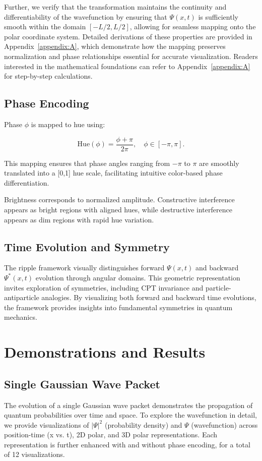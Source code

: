 \documentclass[12pt]{article}
\begin{document}
Further, we verify that the transformation maintains the continuity and differentiability of the wavefunction by ensuring that \(\Psi(x,t)\) is sufficiently smooth within the domain \([-L/2, L/2]\), allowing for seamless mapping onto the polar coordinate system. Detailed derivations of these properties are provided in Appendix~\ref{appendix:A}, which demonstrate how the mapping preserves normalization and phase relationships essential for accurate visualization. Readers interested in the mathematical foundations can refer to Appendix~\ref{appendix:A} for step-by-step calculations.

\subsection{Phase Encoding}
Phase \(\phi\) is mapped to hue using:

\[
\text{Hue}(\phi) = \frac{\phi + \pi}{2\pi}, \quad \phi \in [-\pi, \pi].
\]

This mapping ensures that phase angles ranging from \(-\pi\) to \(\pi\) are smoothly translated into a [0,1] hue scale, facilitating intuitive color-based phase differentiation.

Brightness corresponds to normalized amplitude. Constructive interference appears as bright regions with aligned hues, while destructive interference appears as dim regions with rapid hue variation.

\subsection{Time Evolution and Symmetry}
The ripple framework visually distinguishes forward \(\Psi(x,t)\) and backward \(\Psi^*(x,t)\) evolution through angular domains. This geometric representation invites exploration of symmetries, including CPT invariance and particle-antiparticle analogies. By visualizing both forward and backward time evolutions, the framework provides insights into fundamental symmetries in quantum mechanics.

\section{Demonstrations and Results}
\label{sec:demonstrations_results}

\subsection{Single Gaussian Wave Packet}
The evolution of a single Gaussian wave packet demonstrates the propagation of quantum probabilities over time and space. To explore the wavefunction in detail, we provide visualizations of \(|\Psi|^2\) (probability density) and \(\Psi\) (wavefunction) across position-time (x vs. t), 2D polar, and 3D polar representations. Each representation is further enhanced with and without phase encoding, for a total of 12 visualizations.
    
\end{document}

